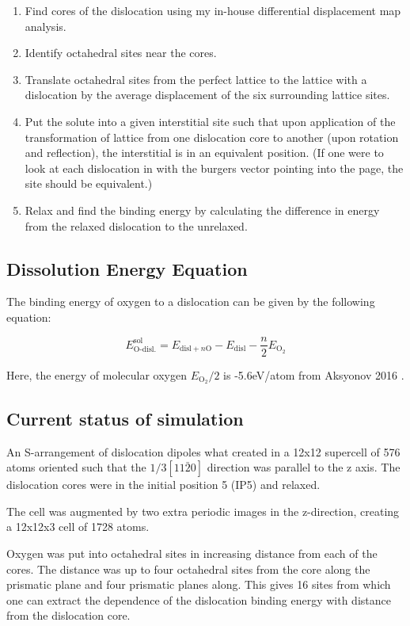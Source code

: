 \documentclass[11pt]{article}
\begin{document}
\begin{enumerate}
\item Find cores of the dislocation using my in-house differential
displacement map analysis.
\item Identify octahedral sites near the cores.
\item Translate octahedral sites from the perfect lattice to the
lattice with a dislocation by the average displacement of the six
surrounding lattice sites.
\item Put the solute into a given interstitial site such that upon
application of the transformation of lattice from one
dislocation core to another (upon rotation and reflection), the
interstitial is in an equivalent position. (If one were to look
at each dislocation in with the burgers vector pointing into the
page, the site should be equivalent.)
\item Relax and find the binding energy by calculating the difference
in energy from the relaxed dislocation to the unrelaxed.
\end{enumerate}


\subsection{Dissolution Energy Equation}
\label{sec:org82a2472}

The binding energy of oxygen to a dislocation can be given by the
following equation:

\[ E^{\text{sol}}_{\text{O-disl.}} = E_{\text{disl} + n\text{O}} -
   E_{\text{disl}} - \frac{n}{2} E_{\text{O}_2}   \]

Here, the energy of molecular oxygen \(E_{\text{O}_2}/2\) is -5.6eV/atom
from Aksyonov 2016 \cite{Aksyonov2016}. 



\subsection{Current status of simulation}
\label{sec:org781f141}

An S-arrangement of dislocation dipoles what created in a 12x12
supercell of 576 atoms oriented such that the \(1/3[11\bar{2}0]\)
direction was parallel to the z axis. The dislocation cores were in
the initial position 5 (IP5) and relaxed.

The cell was augmented by two extra periodic images in the
z-direction, creating a 12x12x3 cell of 1728 atoms. 

Oxygen was put into octahedral sites in increasing distance
from each of the cores. The distance was up to four octahedral sites
from the core along the prismatic plane and four prismatic planes
along. This gives 16 sites from which one can extract the
dependence of the dislocation binding energy with distance from the
dislocation core.
\end{document}
